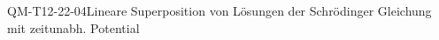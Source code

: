
\begin{CONC}{QM-T12-22-04}{Lineare Superposition von Lösungen der Schrödinger Gleichung mit zeitunabh. Potential}
\end{CONC}
